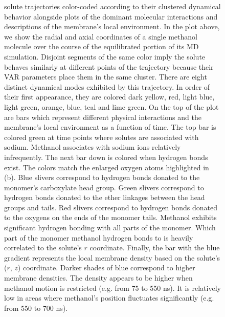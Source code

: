 \documentclass[journal=jpcbfk,manuscript=article]{achemso}
\begin{document}
\begin{figure}
{  solute trajectories color-coded according to their clustered dynamical behavior alongside
  plots of the dominant molecular interactions and descriptions of the membrane's local 
  environment. In the plot above, we show the radial and axial coordinates of a single
  methanol molecule over the course of the equilibrated portion of its MD simulation.
  Disjoint segments of the same color imply the solute behaves similarly at different 
  points of the trajectory because their VAR parameters place them in the same cluster. 
  There are eight distinct dynamical modes exhibited by this trajectory. In order
  of their first appearance, they are colored dark yellow, red, light blue, light green,
  orange, blue, teal and lime green. On the top of the plot are bars which represent different
  physical interactions and the membrane's local environment as a function of time. The top 
  bar is colored green at time points where solutes are associated with sodium. Methanol 
  associates with sodium ions relatively infrequently. The next bar down is colored when hydrogen
  bonds exist. The colors match the enlarged oxygen atoms highlighted in (b). Blue slivers
  correspond to hydrogen bonds donated to the monomer's carboxylate head group. Green slivers
  correspond to  hydrogen bonds donated to the ether linkages between the head groups
  and tails. Red slivers correspond to hydrogen bonds donated to the oxygens on the ends
  of the monomer tails. Methanol exhibits significant hydrogen bonding with all parts of
  the monomer. Which part of the monomer methanol hydrogen bonds to is heavily correlated
  to the solute's $r$ coordinate. Finally, the bar with the blue gradient represents the local 
  membrane density based on the solute's ($r$, $z$) coordinate. Darker shades of blue
  correspond to higher membrane densities. The density appears to be higher when methanol
  motion is restricted (e.g. from 75 to 550 ns). It is relatively low in areas where methanol's
  position fluctuates significantly (e.g. from 550 to 700 ns). 
  }\label{fig:mechanism_map}
  \end{figure}
\end{document}
